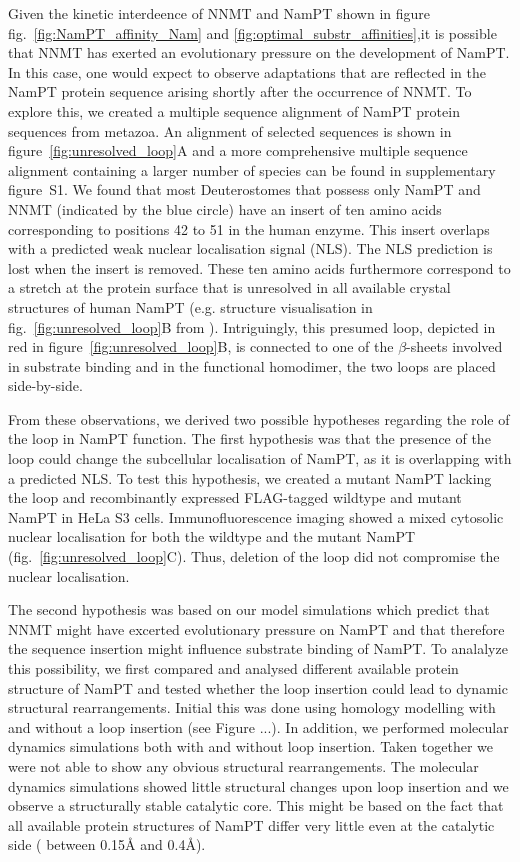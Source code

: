 Given the kinetic interdeence of  NNMT and NamPT shown in figure fig.~\ref{fig:NamPT_affinity_Nam} and \ref{fig:optimal_substr_affinities},it is possible that NNMT has exerted an evolutionary pressure on the development of NamPT. In this case, one would expect to observe adaptations that are reflected in the NamPT protein sequence arising shortly after the occurrence of NNMT. To explore this, we created a multiple sequence alignment of NamPT protein sequences from metazoa. An alignment of selected sequences is shown in figure~\ref{fig:unresolved_loop}A and a more comprehensive multiple sequence alignment containing a larger number of species can be found in supplementary figure~S1. We found that most Deuterostomes that possess only NamPT and NNMT (indicated by the blue circle) have an insert of ten amino acids corresponding to positions 42 to 51 in the human enzyme. This insert overlaps with a predicted weak nuclear localisation signal (NLS). The NLS prediction is lost when the insert is removed. These ten amino acids furthermore correspond to a stretch at the protein surface that is unresolved in all available crystal structures of human NamPT (e.g. structure visualisation in fig.~\ref{fig:unresolved_loop}B from \cite{Wang2006}). Intriguingly, this presumed loop, depicted in red in figure~\ref{fig:unresolved_loop}B, is connected to one of the $\beta$-sheets involved in substrate binding \cite{Burgos2009} and in the functional homodimer, the two loops are placed side-by-side.

From these observations, we derived two possible hypotheses regarding the role of the loop in NamPT function. The first hypothesis was that the presence of the loop could change the subcellular localisation of NamPT, as it is overlapping with a predicted NLS. To test this hypothesis, we created a mutant NamPT lacking the loop and recombinantly expressed FLAG-tagged wildtype and mutant NamPT in HeLa S3 cells. Immunofluorescence imaging showed a mixed cytosolic nuclear localisation for both the wildtype and the mutant NamPT (fig.~\ref{fig:unresolved_loop}C). Thus, deletion of the loop did not compromise the nuclear localisation.

The second hypothesis was  based on our model simulations which predict that NNMT might have excerted evolutionary pressure on  NamPT and that therefore the sequence insertion might influence substrate binding of NamPT.  To analalyze this possibility, we first compared and analysed different available protein structure of NamPT and tested whether  the loop insertion could lead to dynamic structural rearrangements. Initial this was done using homology modelling with and without a loop insertion (see Figure ...). In addition, we performed molecular dynamics simulations both with and without loop insertion. Taken together we were not able to show any obvious structural rearrangements. The molecular dynamics simulations showed little structural changes upon loop insertion and we observe a structurally stable catalytic core. This might be based on the fact that  all available protein structures of NamPT differ very little even at the catalytic side ( between 0.15Å and 0.4Å). 


